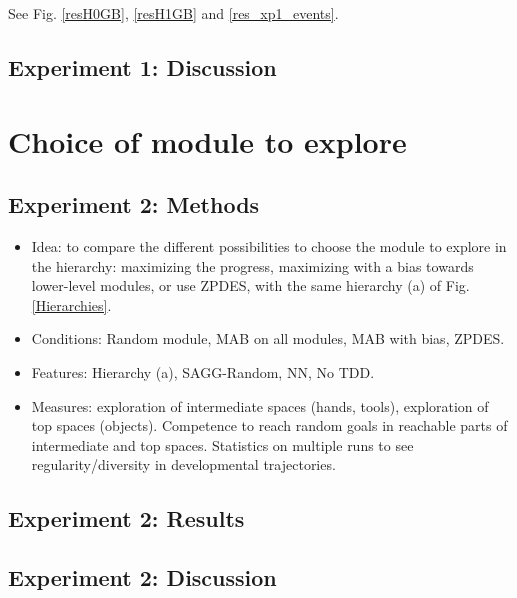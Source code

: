 \documentclass[conference]{include/IEEEtran}
\begin{document}
		
		See Fig. \ref{resH0GB}, \ref{resH1GB} and \ref{res_xp1_events}.
		
	
	\subsection{Experiment 1: Discussion}	
	

%
	
\section{Choice of module to explore}


	
	\subsection{Experiment 2: Methods}	
		
		\begin{itemize}
			\item Idea: to compare the different possibilities to choose the module to explore in the hierarchy: maximizing the progress, maximizing with a bias towards lower-level modules, or use ZPDES,
					with the same hierarchy (a) of Fig. \ref{Hierarchies}.
			
			\item Conditions: Random module, MAB on all modules, MAB with bias, ZPDES.
			
			\item Features: Hierarchy (a), SAGG-Random, NN, No TDD.
			
			\item Measures: exploration of intermediate spaces (hands, tools), exploration of top spaces (objects). Competence to reach random goals in reachable parts of intermediate and top spaces. 
					Statistics on multiple runs to see regularity/diversity in developmental trajectories.
		\end{itemize}
		
		
	
	\subsection{Experiment 2: Results}

		
	
	\subsection{Experiment 2: Discussion}	
	
\end{document}
